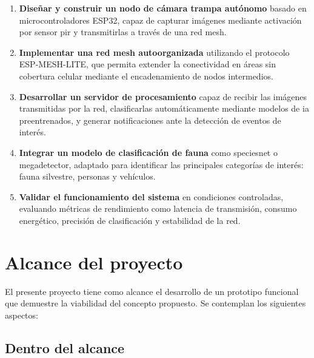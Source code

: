 \documentclass[a4paper, 12pt]{report}
\begin{document}
\begin{enumerate}
  \item \textbf{Diseñar y construir un nodo de cámara trampa autónomo} basado en
    microcontroladores \gls{ESP32}, capaz de capturar imágenes mediante
    activación por sensor \gls{pir} y transmitirlas a través de una red
    \gls{mesh}.

  \item \textbf{Implementar una red mesh autoorganizada} utilizando el
    protocolo \gls{ESP-MESH-LITE}, que permita extender la conectividad en
    áreas sin cobertura celular mediante el encadenamiento de nodos
    intermedios.

  \item \textbf{Desarrollar un servidor de procesamiento} capaz de recibir
    las imágenes transmitidas por la red, clasificarlas automáticamente
    mediante modelos de \gls{ia} preentrenados, y generar notificaciones
    ante la detección de eventos de interés.

  \item \textbf{Integrar un modelo de clasificación de fauna} como
    \gls{speciesnet} o \gls{megadetector}, adaptado para identificar
    las principales categorías de interés: fauna silvestre, personas y
    vehículos.

  \item \textbf{Validar el funcionamiento del sistema} en condiciones
    controladas, evaluando métricas de rendimiento como latencia de
    transmisión, consumo energético, precisión de clasificación y
    estabilidad de la red.
\end{enumerate}

\section{Alcance del proyecto}

El presente proyecto tiene como alcance el desarrollo de un prototipo funcional
que demuestre la viabilidad del concepto propuesto. Se contemplan los siguientes
aspectos:

\subsection{Dentro del alcance}
\end{document}
